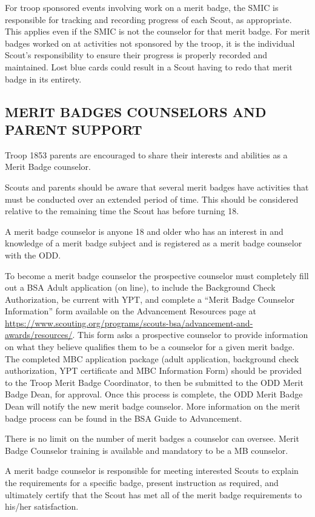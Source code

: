 \documentclass{ltxguide}
\begin{document}
For troop sponsored events involving work on a merit badge, the SMIC is responsible for tracking and recording progress of each Scout, as appropriate. This applies even if the SMIC is not the counselor for that merit badge. For merit badges worked on at activities not sponsored by the troop, it is the individual Scout's responsibility to ensure their progress is properly recorded and maintained. Lost blue cards could result in a Scout having to redo that merit badge in its entirety.

\subsection{MERIT BADGES COUNSELORS AND PARENT SUPPORT}
Troop 1853 parents are encouraged to share their interests and abilities as a Merit Badge counselor.

Scouts and parents should be aware that several merit badges have activities that must be conducted over an extended period of time. This should be considered relative to the remaining time the Scout has before turning 18.

A merit badge counselor is anyone 18 and older who has an interest in and knowledge of a merit badge subject and is registered as a merit badge counselor with the \ac{ODD}.

To become a merit badge counselor the prospective counselor must completely fill out a \ac{BSA} Adult application (on line), to include the Background Check Authorization, be current with \ac{YPT}, and complete a “Merit Badge Counselor Information” form available on the Advancement Resources page at \url{https://www.scouting.org/programs/scouts-bsa/advancement-and-awards/resources/}. This form asks a prospective counselor to provide information on what they believe qualifies them to be a counselor for a given merit badge. The completed MBC application package (adult application, background check authorization, YPT certificate and MBC Information Form) should be provided to the Troop Merit Badge Coordinator, to then be submitted to the ODD Merit Badge Dean, for approval. Once this process is complete, the ODD Merit Badge Dean will notify the new merit badge counselor. More information on the merit badge process can be found in the \ac{BSA} Guide to Advancement.

There is no limit on the number of merit badges a counselor can oversee. Merit Badge Counselor training is available and mandatory to be a MB counselor.

A merit badge counselor is responsible for meeting interested Scouts to explain the requirements for a specific badge, present instruction as required, and ultimately certify that the Scout has met all of the merit badge requirements to his/her satisfaction.
\end{document}
